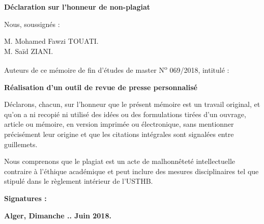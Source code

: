 \newpage
\vspace*{1.2cm}
\begin{center}
    \Large
    \textbf{Déclaration sur l'honneur de non-plagiat}
\end{center}
\vspace*{2.5cm}
Nous, soussignés :
\vspace*{0.5cm}

M. Mohamed Fawzi TOUATI.\\
M. Saïd ZIANI.
\vspace*{1cm}

Auteurs de ce mémoire de fin d'études de master N\textsuperscript{o} 069/2018, intitulé :
\begin{center}
\large
\textbf{
Réalisation d'un outil de revue de presse personnalisé
}
\end{center}
\vspace*{1.2cm}


Déclarons, chacun, sur l'honneur que le présent mémoire est un travail original, et qu'on a ni recopié ni utilisé des idées ou des formulations tirées d'un ouvrage, article ou mémoire, en version imprimée ou électronique, sans mentionner précisément leur origine et que les citations intégrales sont signalées entre guillemets. 

Nous comprenons que le plagiat est un acte de malhonnêteté intellectuelle contraire à l'éthique académique et peut inclure des mesures disciplinaires tel que stipulé dans le règlement intérieur de l'USTHB.


\vspace*{3cm}
\textbf{Signatures :}



\vspace*{4cm}
\hspace*{8.5cm}
\textbf{Alger, Dimanche .. Juin 2018.}
